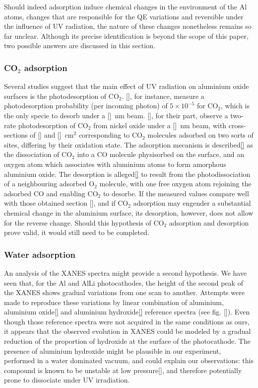 \documentclass[aip,graphicx]{revtex4-1}
\begin{document}
Should indeed adsorption induce chemical changes in the environment of the Al atoms, changes that are responsible for the QE variations and reversible under the influence of UV radiation, the nature of these changes nonetheless remains so far unclear. Although its precise identification is beyond the scope of this paper, two possible answers are discussed in this section.

\subsubsection*{CO$_2$ adsorption}
Several studies suggest that the main effect of UV radiation on aluminium oxide surfaces is the photodesorption of CO$_2$. \ref{}, for instance, measure a photodesorption probability (per incoming photon) of $5\times10^{-5}$ for CO$_2$, which is the only specie to desorb under a []~nm beam. \ref{}, for their part, observe a two-rate photodesorption of CO$_2$ from nickel oxide under a []~nm beam, with cross-sections of [] and []~cm$^2$ corresponding to CO$_2$ molecules adsorbed on two sorts of sites, differing by their oxidation state. 
The adsorption mecanism is described\ref{} as the dissociation of CO$_2$ into a CO molecule physisorbed on the surface, and an oxygen atom which associates with aluminium atoms to form amorphous aluminium oxide. The desorption is alleged\ref{} to result from the photodissociation of a neighbouring adsorbed O$_2$ molecule, with one free oxygen atom rejoining the adsorbed CO and enabling CO$_2$ to desorbe. 
If the measured values compare well with those obtained section [], and if CO$_2$ adsorption may engender a substantial chemical change in the aluminium surface, its desorption, however, does not allow for the reverse change. Should this hypothesis of CO$_2$ adsorption and desorption prove valid, it would still need to be completed.

\subsubsection*{Water adsorption}
An analysis of the XANES spectra might provide a second hypothesis. We have seen that, for the Al and AlLi photocathodes, the height of the second peak of the XANES shows gradual variations from one scan to another. Attempts were made to reproduce these variations by linear combination of aluminium, aluminium oxide\ref{} and aluminium hydroxide\ref{} reference spectra (see fig. []). Even though those reference spectra were not acquired in the same conditions as ours, it appears that the observed evolution in XANES could be modeled by a gradual reduction of the proportion of hydroxide at the surface of the photocathode. The presence of aluminium hydroxide might be plausible in our experiment, performed in a water dominated vacuum, and could explain our observations: this compound is known to be unstable at low pressure\ref{}, and therefore potentially prone to dissociate under UV irradiation. 
\end{document}
